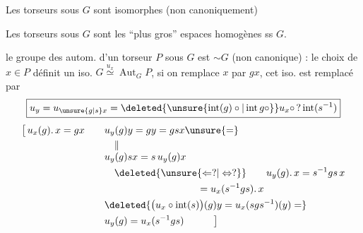 
Les torseurs sous $G$ sont isomorphes (non canoniquement)

Les torseurs sous $G$ sont les ``plus gros'' espaces homogènes ss $G$.

le groupe des autom. d'un torseur $P$ sous $G$ est $\sim G$ (non canonique) : le choix de $x\in P$ définit un iso. $G\overset{u_x}{\simeq}\operatorname{Aut}_{G}P$, si on remplace $x$ par $gx$, cet iso. est remplacé par
\[
\boxed{u_y=u_{\unsure{g|s}x}=\deleted{\unsure{\operatorname{int}(g)\circ|\operatorname{int}g\circ}}u_x\circ\,?\operatorname{int}(s^{-1})}
\]
{\small
\[
\begin{aligned}
\bigl[\,u_x(g).\,x=gx\qquad &u_y(g)y=gy=gsx\unsure{=}\\
&\quad\Vert\\[-3pt]
&u_y(g)sx=s\,u_y(g)x
\\
&\hspace{1em}\deleted{\unsure{\Leftarrow ?|\Leftrightarrow ?}} \qquad u_y(g).\,x=s^{-1}gs\,x\\
&\hspace{9.4em}=u_x(s^{-1}gs).\,x\\
&\deleted{\bigl(u_x\circ\operatorname{int}(s)\bigr)(g)y=u_x(sgs^{-1})(y)=}\\
&u_y(g)=u_x(s^{-1}gs)\hspace{3em}\bigr]
\end{aligned}
\]}

